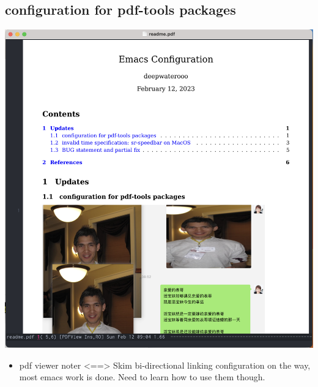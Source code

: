 \documentclass[9pt, b5paper]{article}
\begin{document}
\subsection{configuration for pdf-tools packages}
\label{sec-1-2}

\includegraphics[width=.9\linewidth]{./pic/mememe2.png}
\begin{itemize}
\item pdf viewer noter <==> Skim bi-directional linking configuration on the way, most emacs work is done. Need to learn how to use them though.
\end{itemize}
\end{document}
